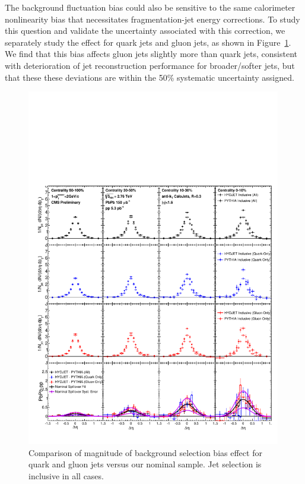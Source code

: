 The background fluctuation bias could also be sensitive to the same calorimeter nonlinearity bias that necessitates fragmentation-jet energy corrections.  To study this question and validate the uncertainty associated with this correction, we separately study the effect for quark jets and gluon jets, as shown in Figure~\ref{fig:quark_gluon_closure}.  We find that this bias affects gluon jets slightly more than quark jets,  consistent with deterioration of jet reconstruction performance for broader/softer jets, but that these these deviations are within the 50\% systematic uncertainty assigned.  


                  \begin{figure}[hbtp]
                  \begin{center}\includegraphics[width=0.99\textwidth]{figures/JFF_SpillOver/QuarkGluonComparison.pdf}
                  \caption[Comparison of background selection bias effect for quark verus gluon jets]{Comparison of magnitude of background selection bias effect for quark and gluon jets versus our nominal sample.  Jet selection is inclusive in all cases.}
                    \label{fig:quark_gluon_closure}
                    \end{center}
                    \end{figure}


